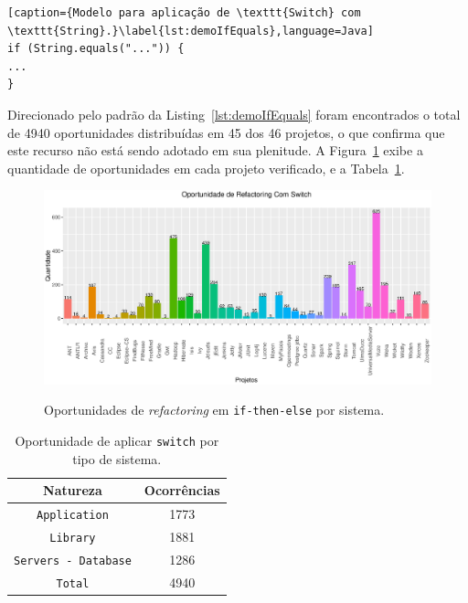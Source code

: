 \begin{lstlisting}[caption={Modelo para aplicação de \texttt{Switch} com \texttt{String}.}\label{lst:demoIfEquals},language=Java] 
if (String.equals("...")) {
...
}
\end{lstlisting}

Direcionado pelo padrão da Listing~\ref{lst:demoIfEquals} foram encontrados o total de \num{4940} oportunidades distribuídas em \num{45} dos \num{46} projetos, o que confirma que este recurso não está sendo adotado em sua plenitude. A Figura~\ref{fig:oportunidadesSwitchString} exibe a quantidade de oportunidades em cada projeto verificado, e a Tabela~\ref{tab:oportunidadesSwitchPorNatureza}.

\begin{figure}[h]
	\center
	\includegraphics[scale=0.55]{Imagens/oportunidadesSwitchString}
	\label{fig:oportunidadesSwitchString}
	\caption{Oportunidades de \textit{refactoring} em \texttt{if-then-else} por sistema.}
\end{figure}


\begin{table}[h]
	\centering
	\caption{Oportunidade de aplicar \texttt{switch} por tipo de sistema.}
	\begin{tabular}{cc}
		\hline
		Natureza & Ocorrências \\ 
		\hline \hline
		\texttt{Application} & 1773 \\ 
		\texttt{Library} & 1881 \\ 
		\texttt{Servers - Database} & 1286 \\ \hline
		\texttt{Total} & 4940 \\ \hline
	\end{tabular}
	\label{tab:oportunidadesSwitchPorNatureza} %
\end{table}



